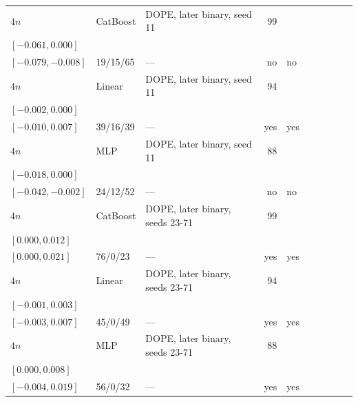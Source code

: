 \begin{longtable}{@{}ll>{\raggedright\arraybackslash}p{1.1in}rllrlll@{}}
$4n$ & CatBoost & DOPE, later binary, seed 11 & 99 & \begin{tabular}[t]{@{}l@{}}$-0.021$\\\tiny$[-0.061, 0.000]$\end{tabular} & \begin{tabular}[t]{@{}l@{}}$-0.037$\\\tiny$[-0.079, -0.008]$\end{tabular} & 19/15/65 & --- & no & no \\
$4n$ & Linear & DOPE, later binary, seed 11 & 94 & \begin{tabular}[t]{@{}l@{}}$0.000$\\\tiny$[-0.002, 0.000]$\end{tabular} & \begin{tabular}[t]{@{}l@{}}$0.000$\\\tiny$[-0.010, 0.007]$\end{tabular} & 39/16/39 & --- & yes & yes \\
$4n$ & MLP & DOPE, later binary, seed 11 & 88 & \begin{tabular}[t]{@{}l@{}}$-0.012$\\\tiny$[-0.018, 0.000]$\end{tabular} & \begin{tabular}[t]{@{}l@{}}$-0.020$\\\tiny$[-0.042, -0.002]$\end{tabular} & 24/12/52 & --- & no & no \\
$4n$ & CatBoost & DOPE, later binary, seeds 23-71 & 99 & \begin{tabular}[t]{@{}l@{}}$0.007$\\\tiny$[0.000, 0.012]$\end{tabular} & \begin{tabular}[t]{@{}l@{}}$0.011$\\\tiny$[0.000, 0.021]$\end{tabular} & 76/0/23 & --- & yes & yes \\
$4n$ & Linear & DOPE, later binary, seeds 23-71 & 94 & \begin{tabular}[t]{@{}l@{}}$0.000$\\\tiny$[-0.001, 0.003]$\end{tabular} & \begin{tabular}[t]{@{}l@{}}$0.000$\\\tiny$[-0.003, 0.007]$\end{tabular} & 45/0/49 & --- & yes & yes \\
$4n$ & MLP & DOPE, later binary, seeds 23-71 & 88 & \begin{tabular}[t]{@{}l@{}}$0.005$\\\tiny$[0.000, 0.008]$\end{tabular} & \begin{tabular}[t]{@{}l@{}}$0.007$\\\tiny$[-0.004, 0.019]$\end{tabular} & 56/0/32 & --- & yes & yes \\

\end{longtable}
